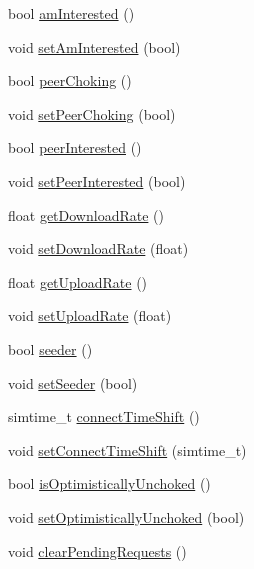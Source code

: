 \begin{DoxyCompactItemize}
\item 
bool \hyperlink{classBTPeerWireClientHandlerBase_aec48d715bfaa4a5eed2ee91f42af1491}{am\+Interested} ()
\item 
void \hyperlink{classBTPeerWireClientHandlerBase_a24864559c78e2de1c25bdb381e083a01}{set\+Am\+Interested} (bool)
\item 
bool \hyperlink{classBTPeerWireClientHandlerBase_a8349a5110429c914d3012f7ab6cf858d}{peer\+Choking} ()
\item 
void \hyperlink{classBTPeerWireClientHandlerBase_a068cc1c357432956497371e0444974eb}{set\+Peer\+Choking} (bool)
\item 
bool \hyperlink{classBTPeerWireClientHandlerBase_ae01019632db70656410a2fd7a5b13707}{peer\+Interested} ()
\item 
void \hyperlink{classBTPeerWireClientHandlerBase_ab7d665b269ef7f0ae6d1d2beaa038ecd}{set\+Peer\+Interested} (bool)
\item 
float \hyperlink{classBTPeerWireClientHandlerBase_a656939f502f38131e6af0d730d752424}{get\+Download\+Rate} ()
\item 
void \hyperlink{classBTPeerWireClientHandlerBase_a1a6e44e8e008679a3ea57dd8426d78e1}{set\+Download\+Rate} (float)
\item 
float \hyperlink{classBTPeerWireClientHandlerBase_aed2663507bd8ed48d7633a939bcacade}{get\+Upload\+Rate} ()
\item 
void \hyperlink{classBTPeerWireClientHandlerBase_a8724c1ba138d3cdea58c6432dad21426}{set\+Upload\+Rate} (float)
\item 
bool \hyperlink{classBTPeerWireClientHandlerBase_a53c834eccb77e823da90874c2fb77307}{seeder} ()
\item 
void \hyperlink{classBTPeerWireClientHandlerBase_a856d49c4e1caf16b0fd2e08b708e7cb5}{set\+Seeder} (bool)
\item 
simtime\+\_\+t \hyperlink{classBTPeerWireClientHandlerBase_ad373932a15efbef51164347aa36fcd7d}{connect\+Time\+Shift} ()
\item 
void \hyperlink{classBTPeerWireClientHandlerBase_af41240e2d031bf252137c4ada0ed29fb}{set\+Connect\+Time\+Shift} (simtime\+\_\+t)
\item 
bool \hyperlink{classBTPeerWireClientHandlerBase_ad6346252c972215582a0cf54dd5ae4c1}{is\+Optimistically\+Unchoked} ()
\item 
void \hyperlink{classBTPeerWireClientHandlerBase_ae6a50a41c2dd39d3b22c5e9d4c60aeef}{set\+Optimistically\+Unchoked} (bool)
\item 
void \hyperlink{classBTPeerWireClientHandlerBase_ac21015df428f260f56965b779bb493a1}{clear\+Pending\+Requests} ()

\end{DoxyCompactItemize}
